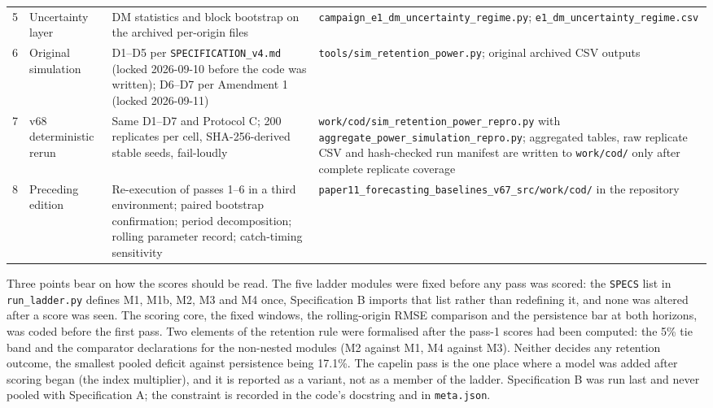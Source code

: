 \begin{table}[!htb]
\begin{tabularx}{\textwidth}{@{}clLL@{}}
5 & Uncertainty layer & DM statistics and block bootstrap on the archived per-origin files & \texttt{campaign\_\allowbreak{}e1\_\allowbreak{}dm\_\allowbreak{}uncertainty\_\allowbreak{}regime.py}; \texttt{e1\_\allowbreak{}dm\_\allowbreak{}uncertainty\_\allowbreak{}regime.csv} \\
6 & Original simulation & D1--D5 per \texttt{SPECIFICATION\_\allowbreak{}v4.md} (locked 2026-09-10 before the code was written); D6--D7 per Amendment 1 (locked 2026-09-11) & \texttt{tools/\allowbreak{}sim\_\allowbreak{}retention\_\allowbreak{}power.py}; original archived CSV outputs \\
7 & v68 deterministic rerun & Same D1--D7 and Protocol C; 200 replicates per cell, SHA-256-derived stable seeds, fail-loudly & \texttt{work/cod/\allowbreak{}sim\_\allowbreak{}retention\_\allowbreak{}power\_\allowbreak{}repro.py} with \texttt{aggregate\_\allowbreak{}power\_\allowbreak{}simulation\_\allowbreak{}repro.py}; aggregated tables, raw replicate CSV and hash-checked run manifest are written to \texttt{work/cod/} only after complete replicate coverage \\
8 & Preceding edition & Re-execution of passes 1--6 in a third environment; paired bootstrap confirmation; period decomposition; rolling parameter record; catch-timing sensitivity & \texttt{paper11\_\allowbreak{}forecasting\_\allowbreak{}baselines\_\allowbreak{}v67\_\allowbreak{}src/\allowbreak{}work/\allowbreak{}cod/\allowbreak{}} in the repository \\
\bottomrule
\end{tabularx}
\end{table}

Three points bear on how the scores should be read. The five ladder modules were fixed before any pass was scored: the \texttt{SPECS} list in \texttt{run\_ladder.py} defines M1, M1b, M2, M3 and M4 once, Specification B imports that list rather than redefining it, and none was altered after a score was seen. The scoring core, the fixed windows, the rolling-origin RMSE comparison and the persistence bar at both horizons, was coded before the first pass. Two elements of the retention rule were formalised after the pass-1 scores had been computed: the 5\% tie band and the comparator declarations for the non-nested modules (M2 against M1, M4 against M3). Neither decides any retention outcome, the smallest pooled deficit against persistence being 17.1\%. The capelin pass is the one place where a model was added after scoring began (the index multiplier), and it is reported as a variant, not as a member of the ladder. Specification B was run last and never pooled with Specification A; the constraint is recorded in the code's docstring and in \texttt{meta.json}.

